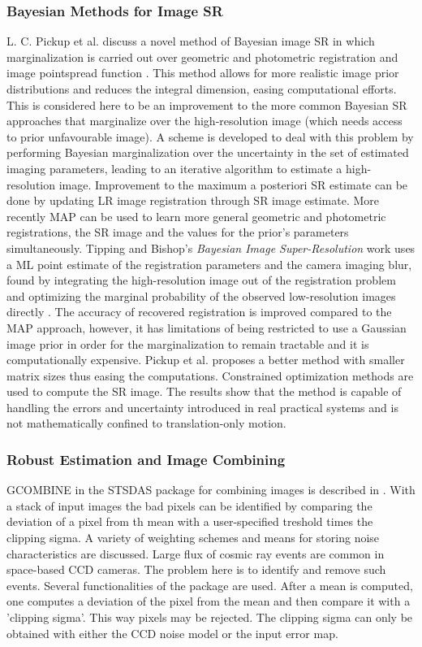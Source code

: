 \subsubsection{Bayesian Methods for Image SR} \label{sec5}
L. C. Pickup et al. discuss a novel method of Bayesian image SR in which marginalization is carried out over geometric and photometric registration and image pointspread function \cite{Pickup2009}. This method allows for more realistic image prior distributions and reduces the integral dimension, easing computational efforts. This is considered here to be an improvement to the more common Bayesian SR approaches that marginalize over the high-resolution image (which needs access to prior unfavourable image). A scheme is developed to deal with this problem by performing Bayesian marginalization over the uncertainty in the set of estimated imaging parameters, leading to an iterative algorithm to estimate a high-resolution image. Improvement to the maximum a posteriori SR estimate can be done by updating LR image registration through SR image estimate. More recently MAP can be used to learn more general geometric and photometric registrations, the SR image and the values for the prior's parameters simultaneously. Tipping and Bishop's \textit{Bayesian Image Super-Resolution} work uses a ML point estimate of the registration parameters and the camera imaging blur, found by integrating the high-resolution image out of the registration problem and optimizing the marginal probability of the observed low-resolution images directly \cite{Tipping2003}. The accuracy of recovered registration is improved compared to the MAP approach, however, it has limitations of being restricted to use a Gaussian image prior in order for the marginalization to remain tractable and it is computationally expensive. Pickup et al. proposes a better method with smaller matrix sizes thus easing the computations. Constrained optimization methods are used to compute the SR image. The results show that the method is capable of handling the errors and uncertainty introduced in real practical systems and is not mathematically confined to translation-only motion.

\subsubsection{Robust Estimation and Image Combining}  \label{sec6}
GCOMBINE in the STSDAS package for combining images is described in \cite{Zhang1995}. With a stack of input images the bad pixels can be identified by comparing the deviation of a pixel from th mean with a user-specified treshold times the clipping sigma. A variety of weighting schemes and means for storing noise characteristics are discussed. Large flux of cosmic ray events are common in space-based CCD cameras. The problem here is to identify and remove such events. Several functionalities of the package are used. After a mean is computed, one computes a deviation of the pixel from the mean and then compare it with a 'clipping sigma'. This way pixels may be rejected. The clipping sigma can only be obtained with either the CCD noise model or the input error map.


